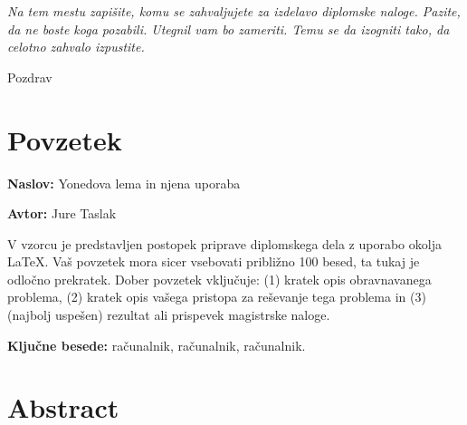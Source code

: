 \documentclass[12pt,a4paper]{book}
\newcommand{\ttitle}{Yonedova lema in njena uporaba}
\newcommand{\tauthor}{Jure Taslak}
\newcommand{\tkeywords}{računalnik, računalnik, računalnik}
\newcommand{\clearemptydoublepage}{\newpage{\pagestyle{empty}\cleardoublepage}}
\theoremstyle{definition}
\theoremstyle{plain}
\theoremstyle{definition}
\theoremstyle{remark}
\begin{document}
\vspace{2cm}

\clearemptydoublepage

\thispagestyle{empty}\mbox{}\vfill\null\it%
\noindent
Na tem mestu zapišite, komu se zahvaljujete za izdelavo diplomske naloge. Pazite, da ne boste koga pozabili. Utegnil vam bo zameriti. Temu se da izogniti tako, da celotno zahvalo izpustite.
\rm\normalfont

\clearemptydoublepage

Pozdrav

\thispagestyle{empty}\mbox{}{\textheight}\mbox{}\hfill\begin{minipage}{0.55\textwidth}%

\normalfont\end{minipage}

\clearemptydoublepage


\pagestyle{empty}
\def\thepage{}%
\tableofcontents{}

\clearemptydoublepage


\chapter*{Povzetek}

\noindent\textbf{Naslov:} \ttitle
\bigskip

\noindent\textbf{Avtor:} \tauthor
\bigskip

\noindent V vzorcu je predstavljen postopek priprave diplomskega dela z uporabo okolja \LaTeX. Vaš povzetek mora sicer vsebovati približno 100 besed, ta tukaj je odločno prekratek.
Dober povzetek vključuje: (1) kratek opis obravnavanega problema, (2) kratek opis vašega pristopa za reševanje tega problema in (3) (najbolj uspešen) rezultat ali prispevek magistrske naloge.

\bigskip

\noindent\textbf{Ključne besede:} \tkeywords.
\clearemptydoublepage

\chapter*{Abstract}
\end{document}
